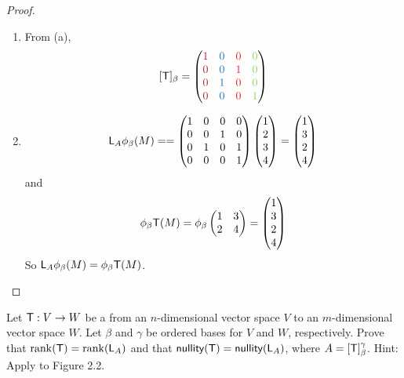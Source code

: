 \begin{proof} \ 

\begin{enumerate}
\item From (a),
\[
    [\T]_{\beta}
    = \begin{pmatrix}
        \MAROON{1} & \BLUE{0} & \RED{0} & \GREEN{0} \\
        \MAROON{0} & \BLUE{0} & \RED{1} & \GREEN{0} \\
        \MAROON{0} & \BLUE{1} & \RED{0} & \GREEN{0} \\
        \MAROON{0} & \BLUE{0} & \RED{0} & \GREEN{1}
    \end{pmatrix}
\]

\item
\[
    \textsf{L}_A \phi_{\beta}(M) = 
    = \begin{pmatrix}
        1 & 0 & 0 & 0 \\
        0 & 0 & 1 & 0 \\
        0 & 1 & 0 & 1 \\
        0 & 0 & 0 & 1
    \end{pmatrix}
    \begin{pmatrix} 1 \\ 2 \\ 3 \\4 \end{pmatrix}
    = \begin{pmatrix} 1 \\ 3 \\ 2 \\ 4 \end{pmatrix}
\]
and
\[
    \phi_{\beta}\textsf{T}(M)
    = \phi_{\beta}\begin{pmatrix} 1 & 3 \\ 2 & 4 \end{pmatrix}
    = \begin{pmatrix} 1 \\ 3 \\ 2 \\ 4 \end{pmatrix}
\]
So \(\textsf{L}_A \phi_{\beta}(M) = \phi_{\beta}\textsf{T}(M)\).
\end{enumerate}
\end{proof}

\begin{exercise} \label{exercise 2.4.20}
Let \(\textsf{T}: V \to W\) be a \LTRAN{} from an \(n\)-dimensional vector space \(V\) to an \(m\)-dimensional vector space \(W\).
Let \(\beta\) and \(\gamma\) be ordered bases for \(V\) and \(W\), respectively.
Prove that \(\mathrm{rank}(\textsf{T}) = \mathrm{rank}(\textsf{L}_A)\) and that \(\textsf{nullity}(\textsf{T}) = \textsf{nullity}(\textsf{L}_A)\), where \(A = [\textsf{T}]_{\beta}^{\gamma}\).
Hint: Apply  to Figure 2.2.
\end{exercise}

